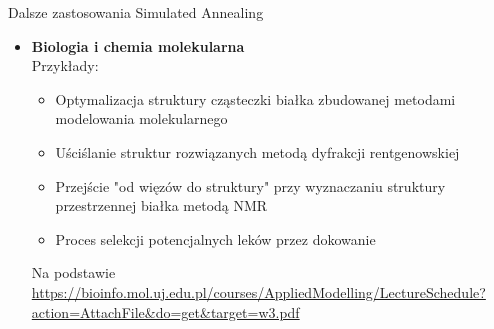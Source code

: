 	\begin{frame}{Dalsze zastosowania Simulated Annealing}
		\begin{itemize}
			\item \textbf{Biologia i chemia molekularna}\\
				Przykłady:
					\begin{itemize}
						\item Optymalizacja struktury cząsteczki białka zbudowanej metodami modelowania molekularnego
						\item Uściślanie struktur rozwiązanych metodą dyfrakcji rentgenowskiej
						\item Przejście "od więzów do struktury" przy wyznaczaniu struktury przestrzennej białka metodą NMR
						\item Proces selekcji potencjalnych leków przez dokowanie
					\end{itemize}
				Na podstawie \url{https://bioinfo.mol.uj.edu.pl/courses/AppliedModelling/LectureSchedule?action=AttachFile&do=get&target=w3.pdf}
		\end{itemize}
	\end{frame}


